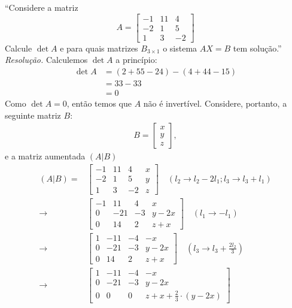 \enquote{Considere a matriz 
\begin{displaymath}
    A = \left[\begin{array}{ccc}
         -1 & 11 & 4 \\
         -2 & 1 & 5 \\
         1 & 3 & -2
    \end{array}\right]
\end{displaymath}
Calcule $\det A$ e para quais matrizes $B_{3\times1}$ o sistema $AX=B$ tem solução.}
\\ 
\emph{Resolução.} Calculemos $\det A$ a princípio:
\begin{align*}
    \det A &= (2 + 55 - 24) - (4 + 44 -15) \\ &=
    33 - 33 \\ & = 
    0
\end{align*}
Como $\det A = 0$, então temos que $A$ não é invertível. Considere, portanto, a seguinte matriz $B$:
\begin{align*}
        B = \left[\begin{array}{c}
             x \\
             y \\
             z
        \end{array}\right],
\end{align*}
e a matriz aumentada $(A|B)$
\begin{align*}
    (A|B) = &\left[\begin{array}{cccc}
        -1 & 11 & 4 & x  \\
        -2 & 1 & 5 & y \\
        1 & 3 & -2 & z
    \end{array}\right] \quad (l_2 \rightarrow l_2 - 2l_1; l_3 \rightarrow l_3 + l_1) \\ \rightarrow
    &\left[\begin{array}{cccc}
         -1 & 11 & 4 & x  \\
         0 & -21 & -3 & y - 2x \\
         0 & 14 & 2 & z + x
    \end{array}\right] \quad (l_1 \rightarrow -l_1) \\ \rightarrow
    &\left[\begin{array}{cccc}
         1 & -11 & -4 & -x  \\
         0 & -21 & -3 & y - 2x \\
         0 & 14 & 2 & z + x
    \end{array}\right] \quad (l_3 \rightarrow l_3 + \frac{2l_2}{3}) \\ \rightarrow
    &\left[\begin{array}{cccc}
         1 & -11 & -4 & -x  \\
         0 & -21 & -3 & y - 2x \\
         0 & 0 & 0 & z + x + \frac{2}{3} \cdot (y - 2x)
    \end{array}\right]
\end{align*}
